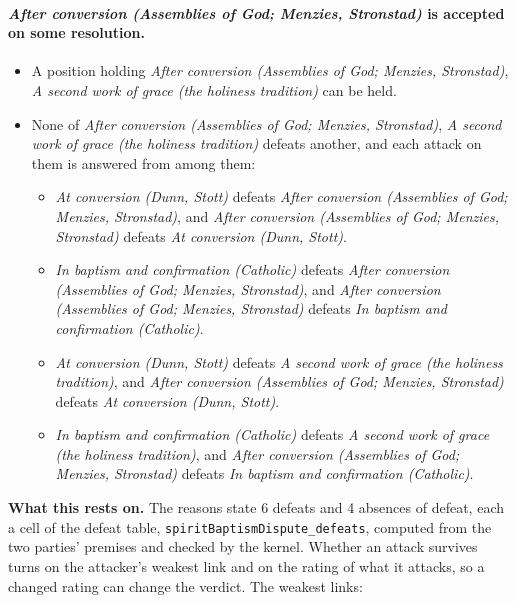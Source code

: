 \documentclass[11pt]{article}
\begin{document}
\paragraph{\emph{After conversion (Assemblies of God; Menzies, Stronstad)} is accepted on some resolution.}
\begin{itemize}
\item A position holding \emph{After conversion (Assemblies of God; Menzies, Stronstad)}, \emph{A second work of grace (the holiness tradition)} can be held.
\item None of \emph{After conversion (Assemblies of God; Menzies, Stronstad)}, \emph{A second work of grace (the holiness tradition)} defeats another, and each attack on them is answered from among them:
\begin{itemize}
\item \emph{At conversion (Dunn, Stott)} defeats \emph{After conversion (Assemblies of God; Menzies, Stronstad)}, and \emph{After conversion (Assemblies of God; Menzies, Stronstad)} defeats \emph{At conversion (Dunn, Stott)}.
\item \emph{In baptism and confirmation (Catholic)} defeats \emph{After conversion (Assemblies of God; Menzies, Stronstad)}, and \emph{After conversion (Assemblies of God; Menzies, Stronstad)} defeats \emph{In baptism and confirmation (Catholic)}.
\item \emph{At conversion (Dunn, Stott)} defeats \emph{A second work of grace (the holiness tradition)}, and \emph{After conversion (Assemblies of God; Menzies, Stronstad)} defeats \emph{At conversion (Dunn, Stott)}.
\item \emph{In baptism and confirmation (Catholic)} defeats \emph{A second work of grace (the holiness tradition)}, and \emph{After conversion (Assemblies of God; Menzies, Stronstad)} defeats \emph{In baptism and confirmation (Catholic)}.
\end{itemize}
\end{itemize}
\par\noindent\textbf{What this rests on.} The reasons state 6 defeats and 4 absences of defeat, each a cell of the defeat table, \texttt{spirit\allowbreak{}Baptism\allowbreak{}Dispute\_\allowbreak{}defeats}, computed from the two parties' premises and checked by the kernel. Whether an attack survives turns on the attacker's weakest link and on the rating of what it attacks, so a changed rating can change the verdict. The weakest links:
\end{document}
